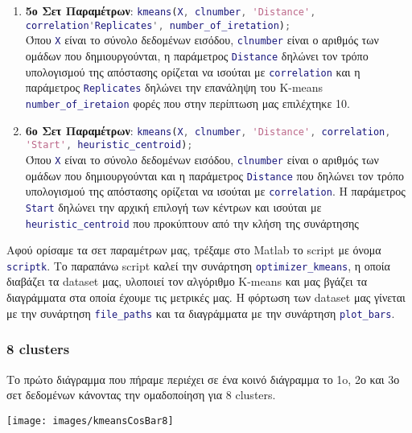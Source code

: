 \begin{enumerate}
\item \textbf{5ο Σετ Παραμέτρων}:
\lstinline[language=MATLAB, breaklines=true]!kmeans(X, clnumber, 'Distance', correlation'Replicates', number_of_iretation);!
\\Όπου
\lstinline[language=MATLAB]!X! είναι το σύνολο δεδομένων εισόδου,
\lstinline[language=MATLAB]!clnumber! είναι ο αριθμός των ομάδων που δημιουργούνται, η παράμετρος
\lstinline[language=MATLAB]!Distance! δηλώνει τον τρόπο υπολογισμού της απόστασης ορίζεται να ισούται με
\lstinline[language=MATLAB]!correlation! και η παράμετρος \lstinline[language=MATLAB]!Replicates! δηλώνει την επανάληψη του K-means
\lstinline[language=MATLAB]!number_of_iretaion! φορές που στην περίπτωση μας επιλέχτηκε 10.

\item \textbf{6ο Σετ Παραμέτρων}:
\lstinline[language=MATLAB, breaklines=true]!kmeans(X, clnumber, 'Distance', correlation, 'Start', heuristic_centroid);!
\\Όπου
\lstinline[language=MATLAB]!X! είναι το σύνολο δεδομένων εισόδου,
\lstinline[language=MATLAB]!clnumber! είναι ο αριθμός των ομάδων που δημιουργούνται και η παράμετρος
\lstinline[language=MATLAB]!Distance! που δηλώνει τον τρόπο υπολογισμού της απόστασης ορίζεται να ισούται με
\lstinline[language=MATLAB]!correlation!.
Η παράμετρος \lstinline[language=MATLAB]!Start! δηλώνει την αρχική επιλογή των κέντρων και ισούται με
\lstinline[language=MATLAB]!heuristic_centroid! που προκύπτουν από την κλήση της συνάρτησης
\end{enumerate}

Αφού ορίσαμε τα σετ παραμέτρων μας, τρέξαμε στο Matlab το script με όνομα \lstinline[language=MATLAB]!scriptk!.
Tο παραπάνω script καλεί την συνάρτηση \lstinline[language=MATLAB]!optimizer_kmeans!, η οποία διαβάζει τα dataset μας, υλοποιεί τον αλγόριθμο K-means και μας βγάζει τα διαγράμματα στα οποία έχουμε τις μετρικές μας.
Η φόρτωση των dataset μας γίνεται με την συνάρτηση \lstinline[language=MATLAB]!file_paths! και τα διαγράμματα με την συνάρτηση \lstinline[language=MATLAB]!plot_bars!.

\subsubsection{8 clusters}
Το πρώτο διάγραμμα που πήραμε περιέχει σε ένα κοινό διάγραμμα το 1o, 2ο και 3ο σετ δεδομένων κάνοντας την ομαδοποίηση για 8 clusters.

\noindent\begin{minipage}{\linewidth}
    \centering
    \texttt{[image: images/kmeansCosBar8]}
    \label{fig:kmeansCosBar8}
\end{minipage}

